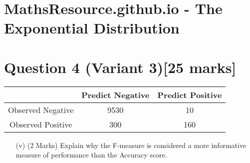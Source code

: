 \documentclass[]{report}
\begin{document}
\section*{MathsResource.github.io - The Exponential Distribution}	


\section*{Question 4 (Variant 3)[25 marks]}


\begin{center}
\begin{tabular}{|c|c|c|}
\hline  & \phantom{spa}Predict Negative\phantom{spa} & \phantom{spa}Predict Positive\phantom{spa} \\ 
\hline\phantom{spa} Observed Negative \phantom{spa}&	9530	&	10	\\ 
\hline \phantom{spa}Observed Positive\phantom{spa} & 	300	&	160	\\ 
\hline 
\end{tabular} 
\end{center}

\begin{itemize}	
\item[(v)] (2 Marks) Explain why the F-measure is considered a more informative measure of performance than the Accuracy score.

\end{itemize}
\end{document}
